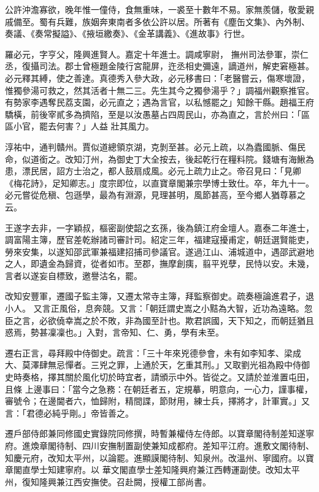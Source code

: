 \begin{pinyinscope}
 公許沖澹寡欲，晚年惟一僮侍，食無重味，一裘至十數年不易。家無羨儲，敬愛親戚備至。蜀有兵難，族姻奔東南者多依公許以居。所著有《塵缶文集》、內外制、奏議、《奏常擬謚》、《掖垣繳奏》、《金革講義》、《進故事》行世。



 羅必元，字亨父，隆興進賢人。嘉定十年進士。調咸寧尉，
 撫州司法參軍，崇仁丞，復攝司法。郡士曾極題金陵行宮龍屏，迕丞相史彌遠，謫道州，解吏窘極甚。必元釋其縛，使之善達。真德秀入參大政，必元移書曰：「老醫嘗云，傷寒壞證，惟獨參湯可救之，然其活者十無二三。先生其今之獨參湯乎？」調福州觀察推官。有勢家李遇奪民荔支園，必元直之；遇為言官，以私憾罷之」知餘干縣。趙福王府驕橫，前後宰貳多為擠陷，至是以汝愚墓占四周民山，亦為直之，言於州曰：「區區小官，罷去何害？」人益
 壯其風力。



 淳祐中，通判贛州。賈似道總領京湖，克剝至甚。必元上疏，以為蠹國脈、傷民命，似道銜之。改知汀州，為御史丁大全按去，後起乾行在糧料院。錢塘有海鰍為患，漂民居，詔方士治之，都人鼓扇成風。必元上疏力止之。帝召見曰：「見卿《梅花詩》，足知卿志。」度宗即位，以直寶章閣兼宗學博士致仕。卒，年九十一。必元嘗從危稹、包遜學，最為有淵源，見理甚明，風節甚高，至今鄉人猶尊慕之云。



 王遂字去非，一字穎叔，樞密副使韶之玄孫，後為鎮江府金壇人。嘉泰二年進士，調富陽主簿，歷官差乾辦諸司審計司。紹定三年，福建寇擾甫定，朝廷選賢能吏，勞來安集，以遂知邵武軍兼福建招捕司參議官。遂過江山、浦城道中，遇邵武避地之人，即遺金為歸資，從者如市。至郡，撫摩創痍，翦平兇孽，民恃以安。未幾，言者以遂妄自標致，邀譽沽名，罷。



 改知安豐軍，遷國子監主簿，又遷太常寺主簿，拜監察御史。疏奏極論進君子，退小人。
 又言正風俗，息奔競。又言：「朝廷謂史嵩之小黠為大智，近功為遠略。忽臣之言，必欲僥幸嵩之於不敗，非為國至計也。欺君誤國，天下知之，而朝廷猶且惑焉，勢甚凜凜也。」入對，言帝知、仁、勇，學有未至。



 遷右正言，尋拜殿中侍御史。疏言：「三十年來兇德參會，未有如李知孝、梁成大、莫澤肆無忌憚者。三兇之罪，上通於天，乞重其刑。」又取劉光祖為殿中侍御史時奏格，擇其關於風化切於時宜者，請頒示中外。皆從之。又請於並淮置屯田，且條
 上邊事曰：「當今之急務：在朝廷者五，定規摹，明意向，一心力，謹事權，審號令；在邊閫者六，恤歸附，精間諜，節財用，練士兵，擇將才，計軍實。」又言：「君德必純乎剛。」帝皆善之。



 遷戶部侍郎兼同修國史實錄院同修撰，時暫兼權侍左侍郎。以寶章閣待制差知遂寧府。進煥章閣待制、四川安撫制置副使兼知成都府。差知平江府。進敷文閣待制、知慶元府，改知太平州，以論罷。進顯謨閣待制、知泉州。改溫州、寧國府。以寶章閣直學士知建寧府。以
 華文閣直學士差知隆興府兼江西轉運副使。改知太平州，復知隆興兼江西安撫使。召赴闕，授權工部尚書。




\end{pinyinscope}
